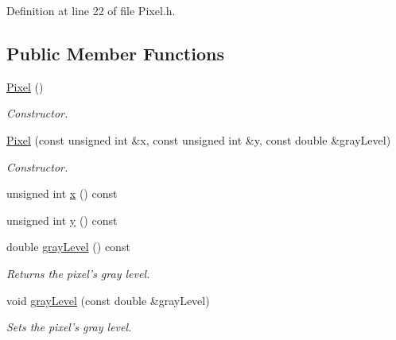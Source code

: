 Definition at line 22 of file Pixel.h.\subsection*{Public Member Functions}
\begin{CompactItemize}
\item 
\hyperlink{class_pixel_27ad99a2f705e635c42d242d530d4756}{Pixel} ()
\begin{CompactList}\small\item\em Constructor. \item\end{CompactList}\item 
\hyperlink{class_pixel_e54d95bf19847e4857eeb03f1138ceb9}{Pixel} (const unsigned int \&x, const unsigned int \&y, const double \&grayLevel)
\begin{CompactList}\small\item\em Constructor. \item\end{CompactList}\item 
unsigned int \hyperlink{class_pixel_68dafccc4588fb33d445641c2766316b}{x} () const 
\item 
unsigned int \hyperlink{class_pixel_204cc91a99e1e4f1d96c9cf6caf5747a}{y} () const 
\item 
double \hyperlink{class_pixel_6e445cee8bfa4475238823e0b6da42b0}{grayLevel} () const 
\begin{CompactList}\small\item\em Returns the pixel's gray level. \item\end{CompactList}\item 
void \hyperlink{class_pixel_5f287c6a53167076bc8f1ce54e74e38d}{grayLevel} (const double \&grayLevel)
\begin{CompactList}\small\item\em Sets the pixel's gray level. \item\end{CompactList}\end{CompactItemize}
